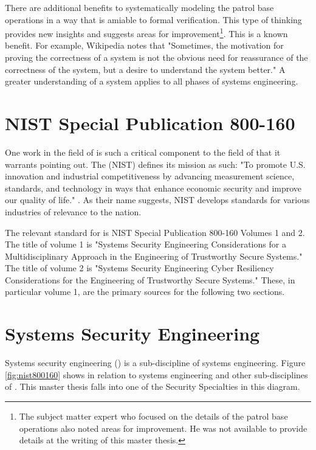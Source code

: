 \documentclass[../../main/main.tex]{subfiles}
\begin{document}
There are additional benefits to systematically modeling the patrol base operations in a way that is amiable to formal verification.  This type of thinking provides new insights and suggests areas for improvement\footnote{The subject matter expert who focused on the details of the patrol base operations also noted areas for improvement.  He was not available to provide details at the writing of this master thesis.}.  This is a known benefit.  For example, Wikipedia \cite{wikiformalmethods} notes that "Sometimes, the motivation for proving the correctness of a system is not the obvious need for reassurance of the correctness of the system, but a desire to understand the system better."  A greater understanding of a system applies to all phases of systems engineering.

\section{NIST Special Publication 800-160}
One work in the field of  is such a critical component to the field of  that it warrants pointing out. The  (NIST) defines its mission as such: "To promote U.S. innovation and industrial competitiveness by advancing measurement science, standards, and technology in ways that enhance economic security and improve our quality of life." \cite{nistmission}.  As their name suggests, NIST develops standards for various industries of relevance to the nation.   

The relevant standard for  is NIST Special Publication 800-160 Volumes 1 and 2. The title of volume 1 is "Systems Security Engineering
Considerations for a Multidisciplinary Approach in the Engineering of Trustworthy Secure Systems."  The title of volume 2 is "Systems Security Engineering Cyber Resiliency Considerations for the Engineering of Trustworthy Secure Systems."   These, in particular volume 1, are the primary sources for the following two sections.  

\section{Systems Security Engineering}\label{sec:sse} 
Systems security engineering () is a sub-discipline of systems engineering.  Figure \ref{fig:nist800160} shows  in relation to systems engineering and other sub-disciplines of .  This master thesis falls into one of the Security Specialties in this diagram.
\end{document}
